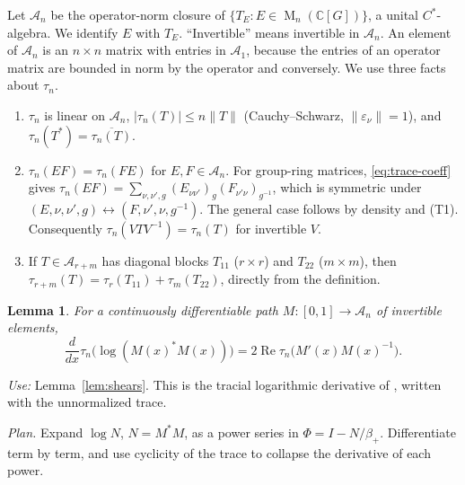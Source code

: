 \documentclass[11pt]{article}
\newtheorem{lemma}[theorem]{Lemma}
\theoremstyle{remark}
\numberwithin{equation}{section}
\newcommand{\C}{\mathbb C}
\newcommand{\Mat}{\operatorname{M}}
\begin{document}
Let $\mathcal A_n$ be the operator-norm closure of $\{T_E:E\in\Mat_n(\C[G])\}$, a unital $C^*$-algebra. We identify $E$ with $T_E$. ``Invertible'' means invertible in $\mathcal A_n$. An element of $\mathcal A_n$ is an $n\times n$ matrix with entries in $\mathcal A_1$, because the entries of an operator matrix are bounded in norm by the operator and conversely. We use three facts about $\tau_n$.
\begin{enumerate}[label=(T\arabic*),leftmargin=2.6em,itemsep=2pt]
\item $\tau_n$ is linear on $\mathcal A_n$, $|\tau_n(T)|\le n\|T\|$ (Cauchy--Schwarz, $\|\varepsilon_\nu\|=1$), and $\tau_n(T^*)=\overline{\tau_n(T)}$.
\item $\tau_n(EF)=\tau_n(FE)$ for $E,F\in\mathcal A_n$. For group-ring matrices, \eqref{eq:trace-coeff} gives
$\tau_n(EF)=\sum_{\nu,\nu',g}(E_{\nu\nu'})_g(F_{\nu'\nu})_{g^{-1}}$, which is symmetric under $(E,\nu,\nu',g)\leftrightarrow(F,\nu',\nu,g^{-1})$. The general case follows by density and (T1). Consequently $\tau_n(VTV^{-1})=\tau_n(T)$ for invertible $V$.
\item If $T\in\mathcal A_{r+m}$ has diagonal blocks $T_{11}$ ($r\times r$) and $T_{22}$ ($m\times m$), then $\tau_{r+m}(T)=\tau_r(T_{11})+\tau_m(T_{22})$, directly from the definition.
\end{enumerate}

\begin{lemma}\label{lem:logderivative}
For a continuously differentiable path
$M:[0,1]\to\mathcal A_n$ of invertible elements,
\[
 \frac{d}{dx}\tau_n\bigl(\log(M(x)^*M(x))\bigr)
 =2\operatorname{Re}\tau_n\bigl(M'(x)M(x)^{-1}\bigr).
\]
\end{lemma}

\emph{Use:} Lemma~\ref{lem:shears}. This is the tracial logarithmic derivative of \cite[Lemma 2]{FK1952}, written with the unnormalized trace.

\emph{Plan.} Expand $\log N$, $N=M^*M$, as a power series in $\Phi=I-N/\beta_+$. Differentiate term by term, and use cyclicity of the trace to collapse the derivative of each power.
\end{document}
